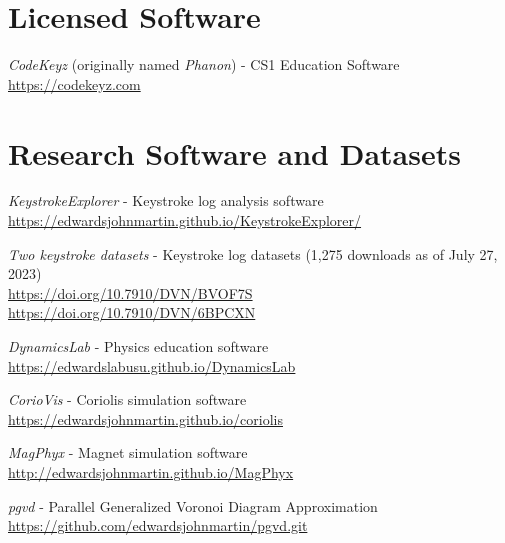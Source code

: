 \documentclass[margin,line]{res}
\begin{document}
\begin{resume}

\section{\sc Licensed Software}

\emph{CodeKeyz} (originally named \emph{Phanon}) - CS1 Education Software\\
\url{https://codekeyz.com}

\section{\sc Research Software and Datasets}

\emph{KeystrokeExplorer} - Keystroke log analysis software\\
\url{https://edwardsjohnmartin.github.io/KeystrokeExplorer/}

\emph{Two keystroke datasets} - Keystroke log datasets (1,275 downloads as of July 27, 2023)\\
\url{https://doi.org/10.7910/DVN/BVOF7S}\\
\url{https://doi.org/10.7910/DVN/6BPCXN}

\emph{DynamicsLab} - Physics education software\\
\url{ https://edwardslabusu.github.io/DynamicsLab}

\emph{CorioVis} - Coriolis simulation software\\
\url{https://edwardsjohnmartin.github.io/coriolis}


\emph{MagPhyx} - Magnet simulation software\\
\url{http://edwardsjohnmartin.github.io/MagPhyx}


\emph{pgvd} - Parallel Generalized Voronoi Diagram Approximation\\
\url{https://github.com/edwardsjohnmartin/pgvd.git}


\end{resume}
\end{document}
